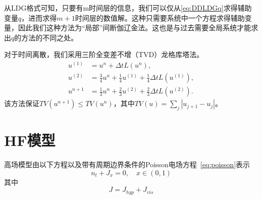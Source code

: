 从LDG格式可知，只要有m时间层的信息，我们可以仅从\eqref{eq:DDLDGq}求得辅助变量$q$，进而求得$m+1$时间层的数值解。这种只需要系统中一个方程求得辅助变量，因此我们这种方法为“局部”间断伽辽金法。这也是与过去需要全局系统才能求出$q$的方法的不同之处。

对于时间离散，我们采用三阶全变差不增（TVD）龙格库塔法。
\begin{align}
    u^{(1)} & = u^n + \Delta t L(u^n),                                                \\
    u^{(2)} & = \frac{3}{4}u^n + \frac{1}{4}u^{(1)} + \frac{1}{4}\Delta t L(u^{(1)}), \\
    u^{n+1} & = \frac{1}{3}u^n + \frac{2}{3}u^{(2)} + \frac{2}{3}\Delta t L(u^{(2)}).
\end{align}
该方法保证$TV(u^{n+1})\leq TV(u^n)$，其中$TV(u) = \sum_j |u_{j+1}-u_j|$。
\section{HF模型}
高场模型由以下方程以及带有周期边界条件的Poisson电场方程~\eqref{eq:poisson}表示
\begin{equation}
    n_{t}+J_{x}=0, \quad x \in(0,1) \label{eq:HF}
\end{equation}
其中
$$
    J=J_{h y p}+J_{v i s}
$$

